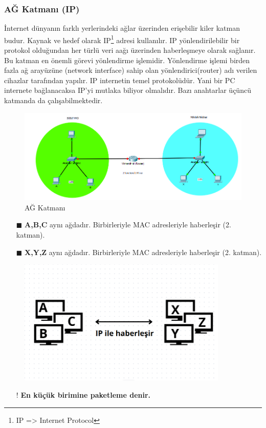 \subsubsection{AĞ Katmanı (IP)}\label{subsubsec:ag_katmani}
\tab İnternet dünyanın farklı yerlerindeki ağlar üzerinden erişebilir kiler katman budur.
Kaynak ve hedef olarak IP\footnote{IP => Internet Protocol} adresi kullanılır.
IP yönlendirilebilir bir protokol olduğundan her türlü veri aağı üzerinden haberleşmeye olarak sağlanır.
Bu katman en önemli görevi yönlendirme işlemidir.
Yönlendirme işlemi birden fazla ağ arayüzüne (network interface) sahip olan yönlendirici(router) adı verilen cihazlar tarafından yapılır.
IP internetin temel protokolüdür.
Yani bir PC internete bağlanacaksa IP'yi mutlaka biliyor olmalıdır.
Bazı anahtarlar üçüncü katmanda da çalışabilmektedir.
\begin{figure}[ht]
	\includegraphics[width=15cm]{images/ip_katman}
	\caption{AĞ Katmanı}
	\label{fig:exemple_for_network_model}
\end{figure}
\begin{enumerate}
	\item[$\blacksquare$] \textbf{A,B,C} aynı ağdadır. Birbirleriyle MAC adresleriyle haberleşir (2. katman).
	\item[$\blacksquare$] \textbf{X,Y,Z} aynı ağdadır. Birbirleriyle MAC adresleriyle haberleşir (2. katman).
\end{enumerate}
\begin{figure}[ht]
	\centering
	\includegraphics[width=10cm]{images/ip_communication}
	\label{fig:exemple_for_ip_communication}
\end{figure}
\begin{enumerate}
	\item[!] \textbf{En küçük birimine paketleme denir.}
\end{enumerate}

